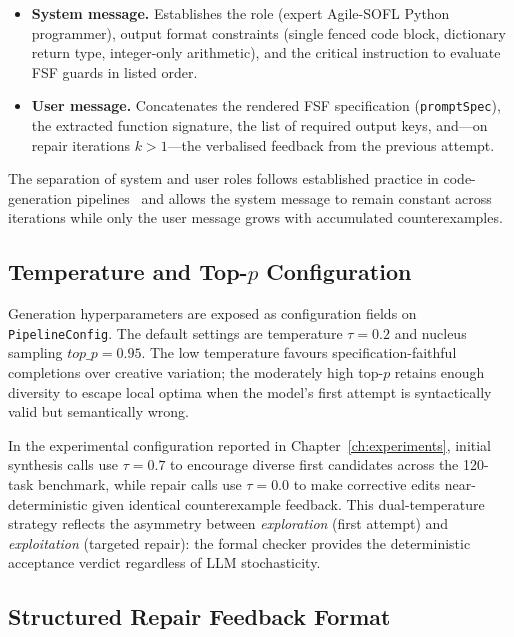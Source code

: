 \begin{itemize}
  \item \textbf{System message.}  Establishes the role (expert Agile-SOFL
        Python programmer), output format constraints (single fenced code
        block, dictionary return type, integer-only arithmetic), and the
        critical instruction to evaluate FSF guards in listed order.
  \item \textbf{User message.}  Concatenates the rendered FSF specification
        (\texttt{promptSpec}), the extracted function signature, the list of
        required output keys, and---on repair iterations $k > 1$---the
        verbalised feedback from the previous attempt.
\end{itemize}

The separation of system and user roles follows established practice in
code-generation pipelines~\citep{chen2021codex,lynn2024verifierloop} and
allows the system message to remain constant across iterations while only
the user message grows with accumulated counterexamples.

\subsection{Temperature and Top-$p$ Configuration}

Generation hyperparameters are exposed as configuration fields on
\texttt{PipelineConfig}.  The default settings are temperature
$\tau = 0.2$ and nucleus sampling $\mathit{top\_p} = 0.95$.  The low
temperature favours specification-faithful completions over creative
variation; the moderately high top-$p$ retains enough diversity to escape
local optima when the model's first attempt is syntactically valid but
semantically wrong.

In the experimental configuration reported in
Chapter~\ref{ch:experiments}, initial synthesis calls use $\tau = 0.7$ to
encourage diverse first candidates across the 120-task benchmark, while
repair calls use $\tau = 0.0$ to make corrective edits near-deterministic
given identical counterexample feedback.  This dual-temperature strategy
reflects the asymmetry between \emph{exploration} (first attempt) and
\emph{exploitation} (targeted repair): the formal checker provides the
deterministic acceptance verdict regardless of LLM stochasticity.

\subsection{Structured Repair Feedback Format}


